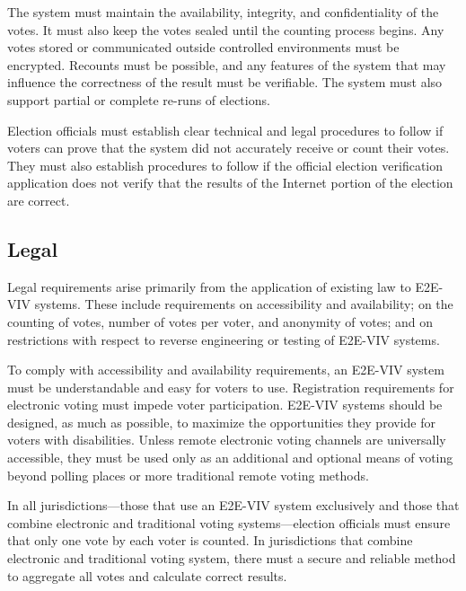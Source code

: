 The system must maintain the availability, integrity, and
confidentiality of the votes. It must also keep the votes sealed until
the counting process begins. Any votes stored or communicated outside
controlled environments must be encrypted. Recounts must be possible,
and any features of the system that may influence the correctness of
the result must be verifiable. The system must also support partial or
complete re-runs of elections. 

Election officials must establish clear technical and legal procedures
to follow if voters can prove that the system did not accurately
receive or count their votes. They must also establish procedures to
follow if the official election verification application does not
verify that the results of the Internet portion of the election are
correct.

\subsection{Legal}

Legal requirements arise primarily from the application of existing
law to E2E-VIV systems. These include requirements on accessibility
and availability; on the counting of votes, number of votes per voter,
and anonymity of votes; and on restrictions with respect to reverse
engineering or testing of E2E-VIV systems.

To comply with accessibility and availability requirements, an E2E-VIV
system must be understandable and easy for voters to use. Registration
requirements for electronic voting must impede voter
participation. E2E-VIV systems should be designed, as much as
possible, to maximize the opportunities they provide for voters with
disabilities. Unless remote electronic voting channels are universally
accessible, they must be used only as an additional and optional means
of voting beyond polling places or more traditional remote voting
methods.

In all jurisdictions---those that use an E2E-VIV system exclusively
and those that combine electronic and traditional voting
systems---election officials must ensure that only one vote by each
voter is counted. In jurisdictions that combine electronic and
traditional voting system, there must a secure and reliable method to
aggregate all votes and calculate correct results.

